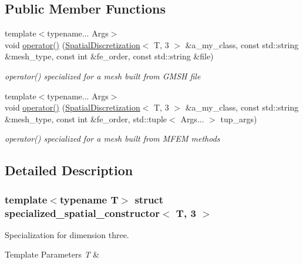 \subsection*{Public Member Functions}
\begin{DoxyCompactItemize}
\item 
{\footnotesize template$<$typename... Args$>$ }\\void \hyperlink{structspecialized__spatial__constructor_3_01T_00_013_01_4_a8649611e9bb708178ef9964360337014}{operator()} (\hyperlink{classSpatialDiscretization}{Spatial\+Discretization}$<$ T, 3 $>$ \&a\+\_\+my\+\_\+class, const std\+::string \&mesh\+\_\+type, const int \&fe\+\_\+order, const std\+::string \&file)
\begin{DoxyCompactList}\small\item\em operator() specialized for a mesh built from G\+M\+SH file \end{DoxyCompactList}\item 
{\footnotesize template$<$typename... Args$>$ }\\void \hyperlink{structspecialized__spatial__constructor_3_01T_00_013_01_4_ac78f53b20f83db96a72397d6f9048500}{operator()} (\hyperlink{classSpatialDiscretization}{Spatial\+Discretization}$<$ T, 3 $>$ \&a\+\_\+my\+\_\+class, const std\+::string \&mesh\+\_\+type, const int \&fe\+\_\+order, std\+::tuple$<$ Args... $>$ tup\+\_\+args)
\begin{DoxyCompactList}\small\item\em operator() specialized for a mesh built from M\+F\+EM methods \end{DoxyCompactList}\end{DoxyCompactItemize}


\subsection{Detailed Description}
\subsubsection*{template$<$typename T$>$\newline
struct specialized\+\_\+spatial\+\_\+constructor$<$ T, 3 $>$}

Specialization for dimension three. 


\begin{DoxyTemplParams}{Template Parameters}
{\em T} & \\
\hline
\end{DoxyTemplParams}


